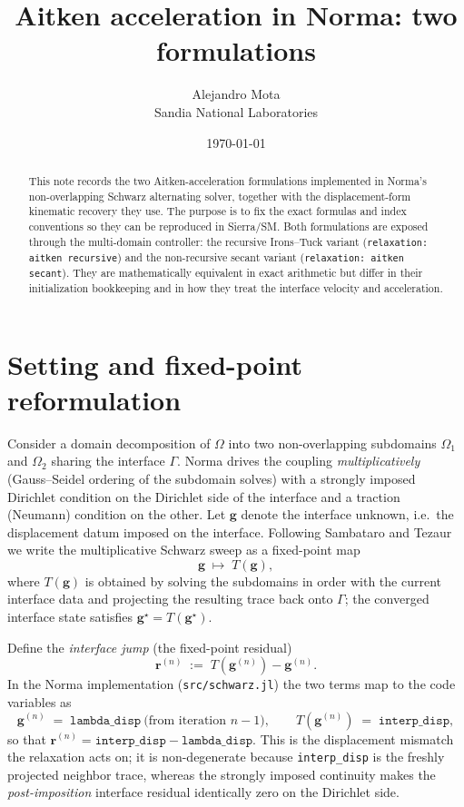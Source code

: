 \documentclass[11pt]{article}
\title{\vspace{-2em}Aitken acceleration in Norma: two formulations}
\author{Alejandro Mota \\ \small Sandia National Laboratories}
\date{\today}
\begin{document}
\maketitle

\begin{abstract}
This note records the two Aitken-acceleration formulations implemented in
Norma's non-overlapping Schwarz alternating solver, together with the
displacement-form kinematic recovery they use. The purpose is to fix the exact
formulas and index conventions so they can be reproduced in Sierra/SM. Both
formulations are exposed through the multi-domain controller: the recursive
Irons--Tuck variant (\texttt{relaxation: aitken recursive}) and the non-recursive secant
variant (\texttt{relaxation: aitken secant}). They are mathematically
equivalent in exact arithmetic but differ in their initialization bookkeeping
and in how they treat the interface velocity and acceleration.
\end{abstract}

\section{Setting and fixed-point reformulation}

Consider a domain decomposition of $\Omega$ into two non-overlapping subdomains
$\Omega_1$ and $\Omega_2$ sharing the interface $\Gamma$. Norma drives the
coupling \emph{multiplicatively} (Gauss--Seidel ordering of the subdomain
solves) with a strongly imposed Dirichlet condition on the Dirichlet side of
the interface and a traction (Neumann) condition on the other. Let $\bm{g}$
denote the interface unknown, i.e.\ the displacement datum imposed on the
interface. Following Sambataro and Tezaur~\cite{SambataroTezaur} we write the
multiplicative Schwarz sweep as a fixed-point map
\begin{equation}
    \bm{g} \;\mapsto\; T(\bm{g}),
    \label{eq:T}
\end{equation}
where $T(\bm{g})$ is obtained by solving the subdomains in order with the
current interface data and projecting the resulting trace back onto $\Gamma$;
the converged interface state satisfies $\bm{g}^\star = T(\bm{g}^\star)$.

Define the \emph{interface jump} (the fixed-point residual)
\begin{equation}
    \bm{r}^{(n)} \;:=\; T\!\left(\bm{g}^{(n)}\right) - \bm{g}^{(n)} .
    \label{eq:residual}
\end{equation}
In the Norma implementation (\texttt{src/schwarz.jl}) the two terms map to the
code variables as
\begin{equation*}
    \bm{g}^{(n)} \;=\; \texttt{lambda\_disp} \ \text{(from iteration $n{-}1$)},
    \qquad
    T\!\left(\bm{g}^{(n)}\right) \;=\; \texttt{interp\_disp} ,
\end{equation*}
so that $\bm{r}^{(n)} = \texttt{interp\_disp} - \texttt{lambda\_disp}$. This is
the displacement mismatch the relaxation acts on; it is non-degenerate because
\texttt{interp\_disp} is the freshly projected neighbor trace, whereas the
strongly imposed continuity makes the \emph{post-imposition} interface residual
identically zero on the Dirichlet side.
\end{document}
